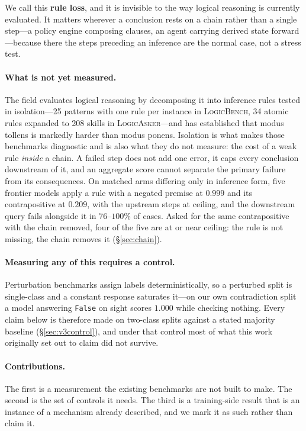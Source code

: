 \documentclass{article}
\begin{document}
We call this \textbf{rule loss}, and it is invisible to the way logical
reasoning is currently evaluated. It matters wherever a conclusion rests on a
chain rather than a single step---a policy engine composing clauses, an agent
carrying derived state forward---because there the steps preceding an inference
are the normal case, not a stress test.

\paragraph{What is not yet measured.} The field evaluates logical reasoning by
decomposing it into inference rules tested in isolation---25 patterns with one
rule per instance in \textsc{LogicBench}, 34 atomic rules expanded to 208 skills
in \textsc{LogicAsker}---and has established that modus tollens is markedly
harder than modus ponens. Isolation is what makes those benchmarks diagnostic
and is also what they do not measure: the cost of a weak rule \emph{inside} a
chain. A failed step does not add one error, it caps every conclusion downstream
of it, and an aggregate score cannot separate the primary failure from its
consequences. On matched arms differing only in inference form, five
frontier models apply a rule with a negated premise at $0.999$ and its
contrapositive at $0.209$, with the upstream steps at ceiling, and the
downstream query fails alongside it in $76$--$100\%$ of cases. Asked for the
same contrapositive with the chain removed, four of the five are at or near
ceiling: the rule is not missing, the chain removes it (\S\ref{sec:chain}).

\paragraph{Measuring any of this requires a control.} Perturbation benchmarks
assign labels deterministically, so a perturbed split is single-class and a
constant response saturates it---on our own contradiction split a model
answering \texttt{False} on sight scores $1.000$ while checking nothing. Every
claim below is therefore made on two-class splits against a stated majority
baseline (\S\ref{sec:v3control}), and under that control most of what this work
originally set out to claim did not survive.

\paragraph{Contributions.} The first is a measurement the existing benchmarks
are not built to make. The second is the set of controls it needs. The third is
a training-side result that is an instance of a mechanism already described,
and we mark it as such rather than claim it.
\end{document}
